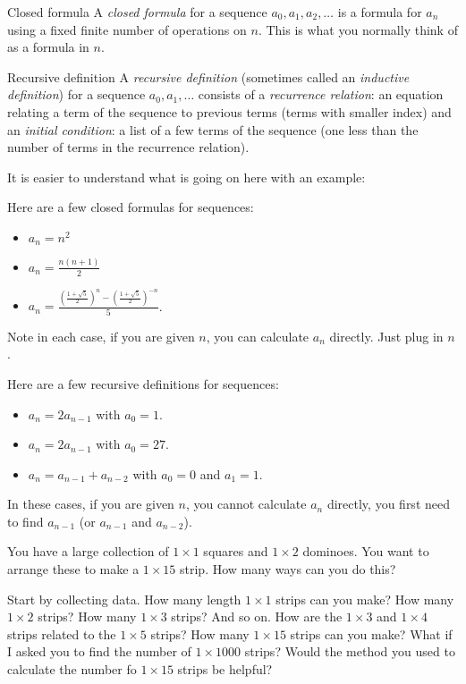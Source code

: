 \documentclass[12pt]{article}
\begin{document}
\begin{defbox}{Closed formula}
 A {\em closed formula} for a sequence $a_0, a_1, a_2,\ldots$ is a formula for $a_n$ using a fixed finite number of operations on $n$.  This is what you normally think of as a formula in $n$.  
\end{defbox}

\begin{defbox}{Recursive definition}
 A {\em recursive definition} (sometimes called an {\em inductive definition}) for a sequence $a_0, a_1, \ldots$ consists of a {\em recurrence relation}: an equation relating a term of the sequence to previous terms (terms with smaller index) and an {\em initial condition}: a list of a few terms of the sequence (one less than the number of terms in the recurrence relation).
\end{defbox}

It is easier to understand what is going on here with an example:

\begin{example}
 Here are a few closed formulas for sequences:
 \begin{itemize}
  \item $a_n = n^2$
  \item $a_n = \frac{n(n+1)}{2}$
  \item $a_n = \frac{\left(\frac{1 + \sqrt 5}{2}\right)^n - \left(\frac{1 + \sqrt 5}{2}\right)^{-n}}{5}$.
 \end{itemize}
 Note in each case, if you are given $n$, you can calculate $a_n$ directly. Just plug in $n$.
 
 Here are a few recursive definitions for sequences:
 \begin{itemize}
  \item $a_n = 2a_{n-1}$ with $a_0 = 1$.
  \item $a_n = 2a_{n-1}$ with $a_0 = 27$.
  \item $a_n = a_{n-1} + a_{n-2}$ with $a_0 = 0$ and $a_1 = 1$.
 \end{itemize}
  In these cases, if you are given $n$, you cannot calculate $a_n$ directly, you first need to find $a_{n-1}$ (or $a_{n-1}$ and $a_{n-2}$). 
\end{example}


\begin{activity}
You have a large collection of $1\times 1$ squares and $1\times 2$ dominoes.  You want to arrange these to make a $1 \times 15$ strip.  How many ways can you do this?
\begin{questions}
  \question Start by collecting data.  How many length $1\times 1$ strips can you make?  How many $1\times 2$ strips?  How many $1\times 3$ strips?  And so on.
  \question How are the $1\times 3$ and $1 \times 4$ strips related to the $1\times 5$ strips?  
  \question How many $1\times 15$ strips can you make?
  \question What if I asked you to find the number of $1\times 1000$ strips?  Would the method you used to calculate the number fo  $1 \times 15$ strips be helpful?  

\end{questions}
\end{activity}
\end{document}
